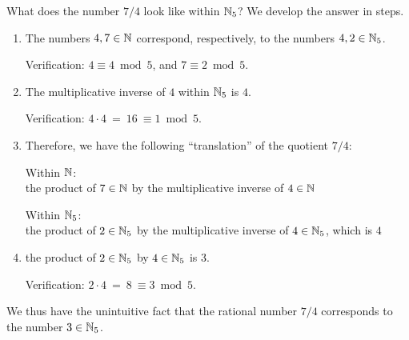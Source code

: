 What does the number $7/4$ look like within $\mathbb{N}_5$?  We develop the answer in steps.

\medskip

\noindent {}

\medskip

\begin{enumerate}
\item
The numbers $4, 7 \in \mathbb{N}$ correspond, respectively, to the numbers $4, 2 \in \mathbb{N}_5$.

\smallskip

Verification:
$4 \equiv 4 \bmod 5$, and $7 \equiv 2 \bmod 5$.

\medskip\item
The multiplicative inverse of $4$ within $\mathbb{N}_5$ is $4$.

\smallskip

Verification:
$4 \cdot 4 \ = \ 16 \ \equiv 1 \bmod 5$.

\medskip\item
Therefore, we have the following ``translation'' of the quotient $7/4$:

\smallskip

Within $\mathbb{N}$: \\
the product of $7 \in \mathbb{N}$ by the multiplicative inverse of $4 \in \mathbb{N}$

\smallskip

Within $\mathbb{N}_5$: \\
the product of $2 \in \mathbb{N}_5$ by the multiplicative inverse of $4 \in \mathbb{N}_5$, which is $4$

\medskip\item
the product of $2 \in \mathbb{N}_5$ by $4 \in \mathbb{N}_5$ is $3$.

\smallskip

Verification:
$2 \cdot 4 \ = \ 8 \ \equiv 3 \bmod 5$.
\end{enumerate}
We thus have the unintuitive fact that the rational number $7/4$ corresponds to the number $3 \in \mathbb{N}_5$.

